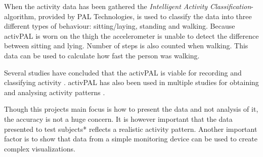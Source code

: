 When the activity data has been gathered the \emph{Intelligent Activity Classification}-algorithm, provided by PAL Technologies, is used to classify the data into three different types of behaviour: sitting/laying, standing and walking. Because activPAL is worn on the thigh the accelerometer is unable to detect the difference between sitting and lying. Number of steps is also counted when walking. This data can be used to calculate how fast the person was walking.

Several studies have concluded that the activPAL is viable for recording and classifying activity \cite{grant2006, ryan2006, grant2008, tsavourelou}. activPAL has also been used in multiple studies for obtaining and analysing activity patterns \cite{grant2010, lord, ryan2010}.

Though this projects main focus is how to present the data and not analysis of it, the accuracy is not a huge concern. It is however important that the data presented to test subjects* reflects a realistic activity pattern. Another important factor is to show that data from a simple monitoring device can be used to create complex visualizations.
